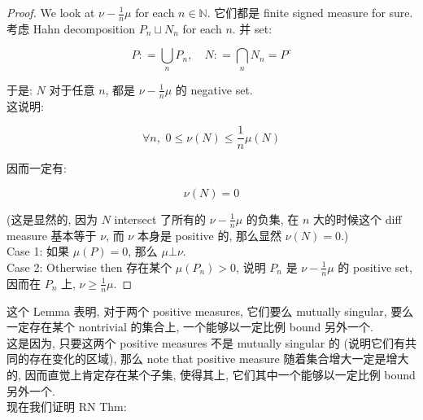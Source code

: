 \documentclass{qlnotes-export}
\begin{document}
\begin{proof}

We look at \(\nu - \frac{1}{n}\mu\) for each \(n \in {\mathbb{N}}\). 它们都是 finite signed measure for sure.\\
考虑 Hahn decomposition \(P_{n} \sqcup N_{n}\) for each \(n\). 并 set:

\[P: = \bigcup\limits_{n}P_{n},\quad N: = \bigcap\limits_{n}N_{n} = P^{c}\]

于是: \(N\) 对于任意 \(n\), 都是 \(\nu - \frac{1}{n}\mu\) 的 negative set.\\
这说明:

\[\forall n,\,\, 0 \leq \nu(N) \leq \frac{1}{n}\mu(N)\]

因而一定有:

\[\nu(N) = 0\]

(这是显然的, 因为 \(N\) intersect 了所有的 \(\nu - \frac{1}{n}\mu\) 的负集, 在 \(n\) 大的时候这个 diff measure 基本等于 \(\nu\), 而 \(\nu\) 本身是 positive 的, 那么显然 \(\nu(N) = 0\).)\\
Case 1: 如果 \(\mu(P) = 0\), 那么 \(\mu\bot\nu\).\\
Case 2: Otherwise then 存在某个 \(\mu(P_{n}) > 0\), 说明 \(P_{n}\) 是 \(\nu - \frac{1}{n}\mu\) 的 positive set, 因而在 \(P_{n}\) 上, \(\nu \geq \frac{1}{n}\mu\).

\end{proof}

这个 Lemma 表明, 对于两个 positive measures, 它们要么 mutually singular, 要么一定存在某个 nontrivial 的集合上, 一个能够以一定比例 bound 另外一个.\\
这是因为, 只要这两个 positive measures 不是 mutually singular 的 (说明它们有共同的存在变化的区域), 那么 note that positive measure 随着集合增大一定是增大的, 因而直觉上肯定存在某个子集, 使得其上, 它们其中一个能够以一定比例 bound 另外一个.\\
现在我们证明 RN Thm:
\end{document}
